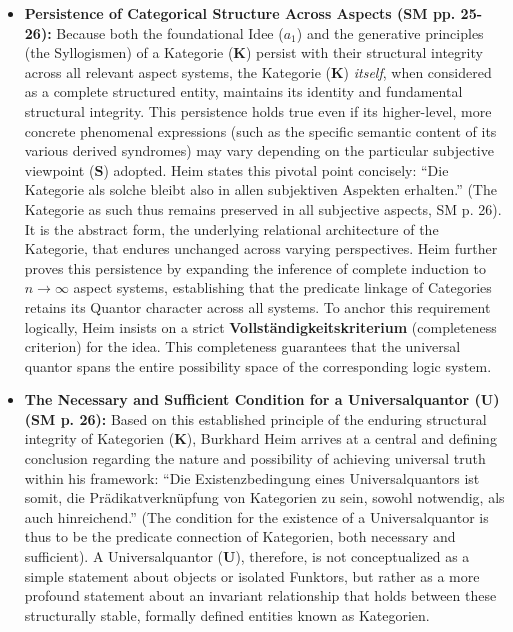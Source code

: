 \documentclass[12pt]{article}
\newcommand{\q}[1]{\enquote{#1}}
\newcommand{\kategorie}{\bm{K}}
\newcommand{\conceptualsyndrome}{a}
\newcommand{\universalquantor}{\bm{U}}
\begin{document}
\begin{itemize}
    \item \textbf{Persistence of Categorical Structure Across Aspects (SM pp. 25-26):}
    Because both the foundational Idee (\(\conceptualsyndrome_1\)) and the generative principles (the Syllogismen) of a Kategorie (\(\kategorie\)) persist with their structural integrity across all relevant aspect systems, the Kategorie (\(\kategorie\)) \textit{itself}, when considered as a complete structured entity, maintains its identity and fundamental structural integrity. This persistence holds true even if its higher-level, more concrete phenomenal expressions (such as the specific semantic content of its various derived syndromes) may vary depending on the particular subjective viewpoint (\(\mathbf{S}\)) adopted. Heim states this pivotal point concisely: \q{Die Kategorie als solche bleibt also in allen subjektiven Aspekten erhalten.} (The Kategorie as such thus remains preserved in all subjective aspects, SM p. 26). It is the abstract form, the underlying relational architecture of the Kategorie, that endures unchanged across varying perspectives. Heim further proves this persistence by expanding the inference of complete induction to \( n \to \infty \) aspect systems, establishing that the predicate linkage of Categories retains its Quantor character across all systems. To anchor this requirement logically, Heim insists on a strict \textbf{Vollständigkeitskriterium} (completeness criterion) for the idea. This completeness guarantees that the universal quantor spans the entire possibility space of the corresponding logic system.

    \item \textbf{The Necessary and Sufficient Condition for a Universalquantor (\(\universalquantor\)) (SM p. 26):}
    Based on this established principle of the enduring structural integrity of Kategorien (\(\kategorie\)), Burkhard Heim arrives at a central and defining conclusion regarding the nature and possibility of achieving universal truth within his framework: \q{Die Existenzbedingung eines Universalquantors ist somit, die Prädikatverknüpfung von Kategorien zu sein, sowohl notwendig, als auch hinreichend.} (The condition for the existence of a Universalquantor is thus to be the predicate connection of Kategorien, both necessary and sufficient). A Universalquantor (\(\universalquantor\)), therefore, is not conceptualized as a simple statement about objects or isolated Funktors, but rather as a more profound statement about an invariant relationship that holds between these structurally stable, formally defined entities known as Kategorien.


\end{itemize}
\end{document}
